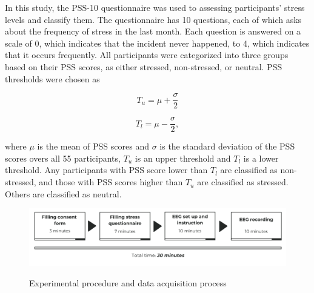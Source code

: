 \documentclass[pdflatex,sn-mathphys]{sn-jnl}%
\theoremstyle{thmstyleone}%
\theoremstyle{thmstyletwo}%
\theoremstyle{thmstylethree}%
\begin{document}
In this study, the PSS-10 questionnaire was used to assessing participants' stress levels and classify them. The questionnaire has 10 questions, each of which asks about the frequency of stress in the last month. Each question is answered on a scale of 0, which indicates that the incident never happened, to 4, which indicates that it occurs frequently. All participants were categorized into three groups based on their PSS scores, as either stressed, non-stressed, or neutral. PSS thresholds were chosen as

\begin{equation} \label{eq:1}
   T_{u} =\mu + \frac{\sigma}{2}
\end{equation}

\begin{equation} \label{eq:2}
   T_{l} =\mu - \frac{\sigma}{2},
\end{equation}

where $\mu$ is the mean of PSS scores and $\sigma$ is the standard deviation of the PSS scores overs all 55 participants, $T_{u}$ is an upper threshold and $T_{l}$ is a lower threshold. Any participants with PSS score lower than $T_{l}$ are classified as non-stressed, and those with PSS scores higher than $T_{u}$ are classified as stressed. Others are classified as neutral.

\begin{figure}[h!]
  \centering
  \caption{Experimental procedure and data acquisition process}
  \includegraphics[width=1\textwidth]{Experimentalprocedure.png}
  \label{fig:procedure}
\end{figure}

\end{document}
